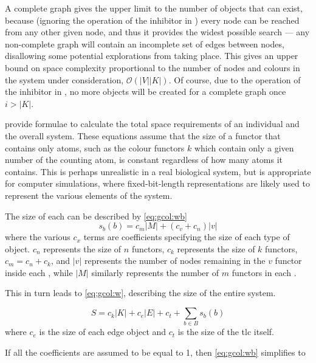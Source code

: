 A complete graph gives the upper limit to the number of objects that can exist, because (ignoring the operation of the \gls{inhibitor} in ) every node can be reached from any other given node, and thus it provides the widest possible search --- any non-complete graph will contain an incomplete set of edges between nodes, disallowing some potential explorations from taking place.  This gives an upper bound on space complexity proportional to the number of nodes and colours in the system under consideration, \ie{} \(\mathcal{O}(|V||K|)\).  Of course, due to the operation of the \gls{inhibitor} in , no more \bo{} objects will be created for a complete graph once \(i > |K|\).

 provide formulae to calculate the total space requirements of an individual \bo{} and the overall system. These equations assume that the size of a \gls{functor} that contains only atoms, such as the colour \glspl{functor} \(k\) which contain only a given number of the counting atom, is constant regardless of how many atoms it contains.  This is perhaps unrealistic in a real biological system, but is appropriate for computer simulations, where fixed-bit-length representations are likely used to represent the various elements of the system.

The size of each \bo{} can be described by \cref{eq:gcol:wb}
\begin{equation}\label{eq:gcol:wb}
    s_b(b) = c_m |M| + (c_v + c_n) |v|
\end{equation} where the various \(c_x\) terms are coefficients specifying the size of each type of object.  \(c_n\) represents the size of \(n\) \glspl{functor}, \(c_k\) represents the size of \(k\) \glspl{functor}, \(c_m = c_n + c_k\), and \(|v|\) represents the number of nodes remaining in the \(v\) \gls{functor} inside each \bo{}, while \(|M|\) similarly represents the number of \(m\) \glspl{functor} in each \bo{}.

This in turn leads to \cref{eq:gcol:w}, describing the size of the entire system.

\begin{equation}\label{eq:gcol:w}
    S = c_k |K| + c_e |E| + c_t + \sum_{b \in B}s_b(b)
\end{equation} where \(c_e\) is the size of each edge object and \(c_t\) is the size of the \gls{tlc} itself.

If all the coefficients are assumed to be equal to 1, then \cref{eq:gcol:wb} simplifies to 

